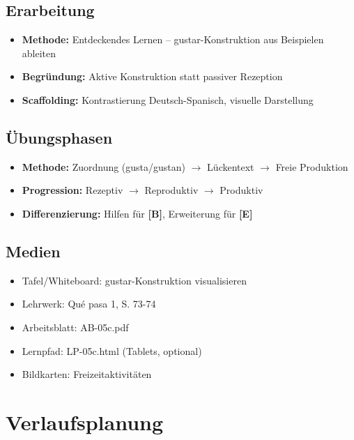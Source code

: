 \documentclass[11pt,a4paper]{article}
\newcommand{\lehrwerk}{Qué pasa 1}
\newcommand{\lehrwerkseite}{S. 73-74}
\newcommand{\B}{\textcolor{basis}{\textbf{[B]}}}
\newcommand{\E}{\textcolor{erweiterung}{\textbf{[E]}}}
\begin{document}
\subsection{Erarbeitung}
\begin{itemize}
    \item \textbf{Methode:} Entdeckendes Lernen -- gustar-Konstruktion aus Beispielen ableiten
    \item \textbf{Begründung:} Aktive Konstruktion statt passiver Rezeption
    \item \textbf{Scaffolding:} Kontrastierung Deutsch-Spanisch, visuelle Darstellung
\end{itemize}

\subsection{Übungsphasen}
\begin{itemize}
    \item \textbf{Methode:} Zuordnung (gusta/gustan) $\rightarrow$ Lückentext $\rightarrow$ Freie Produktion
    \item \textbf{Progression:} Rezeptiv $\rightarrow$ Reproduktiv $\rightarrow$ Produktiv
    \item \textbf{Differenzierung:} Hilfen für \B{}, Erweiterung für \E{}
\end{itemize}

\subsection{Medien}
\begin{itemize}
    \item Tafel/Whiteboard: gustar-Konstruktion visualisieren
    \item Lehrwerk: \lehrwerk, \lehrwerkseite
    \item Arbeitsblatt: AB-05c.pdf
    \item Lernpfad: LP-05c.html (Tablets, optional)
    \item Bildkarten: Freizeitaktivitäten
\end{itemize}

\section{Verlaufsplanung}
\end{document}

